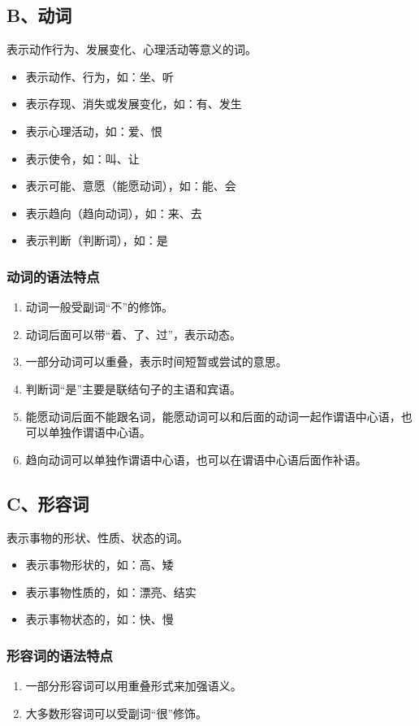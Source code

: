 \subsection{B、动词}
表示动作行为、发展变化、心理活动等意义的词。

\begin{itemize}
    \item 表示动作、行为，如：坐、听
    \item 表示存现、消失或发展变化，如：有、发生
    \item 表示心理活动，如：爱、恨
    \item 表示使令，如：叫、让
    \item 表示可能、意愿（能愿动词），如：能、会
    \item 表示趋向（趋向动词），如：来、去
    \item 表示判断（判断词），如：是
\end{itemize}

\subsubsection*{动词的语法特点}
\begin{enumerate}
    \item 动词一般受副词“不”的修饰。
    \item 动词后面可以带“着、了、过”，表示动态。
    \item 一部分动词可以重叠，表示时间短暂或尝试的意思。
    \item 判断词“是”主要是联结句子的主语和宾语。
    \item 能愿动词后面不能跟名词，能愿动词可以和后面的动词一起作谓语中心语，也可以单独作谓语中心语。
    \item 趋向动词可以单独作谓语中心语，也可以在谓语中心语后面作补语。
\end{enumerate}

\subsection{C、形容词}
表示事物的形状、性质、状态的词。

\begin{itemize}
    \item 表示事物形状的，如：高、矮
    \item 表示事物性质的，如：漂亮、结实
    \item 表示事物状态的，如：快、慢
\end{itemize}

\subsubsection*{形容词的语法特点}
\begin{enumerate}
    \item 一部分形容词可以用重叠形式来加强语义。
    \item 大多数形容词可以受副词“很”修饰。
\end{enumerate}

